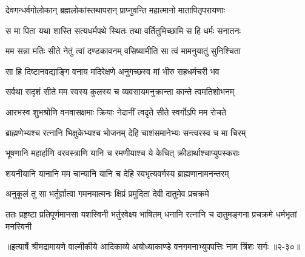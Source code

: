 \twolineshloka
{देवगन्धर्वगोलोकान् ब्रह्मलोकांस्तथापरान्}
{प्राप्नुवन्ति महात्मानो मातापितृपरायणाः} %

\twolineshloka
{स मा पिता यथा शास्ति सत्यधर्मपथे स्थितः}
{तथा वर्तितुमिच्छामि स हि धर्मः सनातनः} %

\twolineshloka
{मम सन्ना मतिः सीते नेतुं त्वां दण्डकावनम्}
{वसिष्यामीति सा त्वं मामनुयातुं सुनिश्चिता} %

\twolineshloka
{सा हि दिष्टानवद्याङ्गि वनाय मदिरेक्षणे}
{अनुगच्छस्व मां भीरु सहधर्मचरी भव} %

\twolineshloka
{सर्वथा सदृशं सीते मम स्वस्य कुलस्य च}
{व्यवसायमनुक्रान्ता कान्ते त्वमतिशोभनम्} %

\twolineshloka
{आरभस्व शुभश्रोणि वनवासक्षमाः क्रियाः}
{नेदानीं त्वदृते सीते स्वर्गोऽपि मम रोचते} %

\twolineshloka
{ब्राह्मणेभ्यश्च रत्नानि भिक्षुकेभ्यश्च भोजनम्}
{देहि चाशंसमानेभ्यः सन्त्वरस्व च मा चिरम्} %

\twolineshloka
{भूषणानि महार्हाणि वरवस्त्राणि यानि च}
{रमणीयाश्च ये केचित् क्रीडार्थाश्चाप्युपस्कराः} %

\twolineshloka
{शयनीयानि यानानि मम चान्यानि यानि च}
{देहि स्वभृत्यवर्गस्य ब्राह्मणानामनन्तरम्} %

\twolineshloka
{अनुकूलं तु सा भर्तुर्ज्ञात्वा गमनमात्मनः}
{क्षिप्रं प्रमुदिता देवी दातुमेव प्रचक्रमे} %

\twolineshloka
{ततः प्रहृष्टा प्रतिपूर्णमानसा यशस्विनी भर्तुरवेक्ष्य भाषितम्}
{धनानि रत्नानि च दातुमङ्गना प्रचक्रमे धर्मभृतां मनस्विनी} %


॥इत्यार्षे श्रीमद्रामायणे वाल्मीकीये आदिकाव्ये अयोध्याकाण्डे वनगमनाभ्युपपत्तिः नाम त्रिंशः सर्गः ॥२-३०॥
